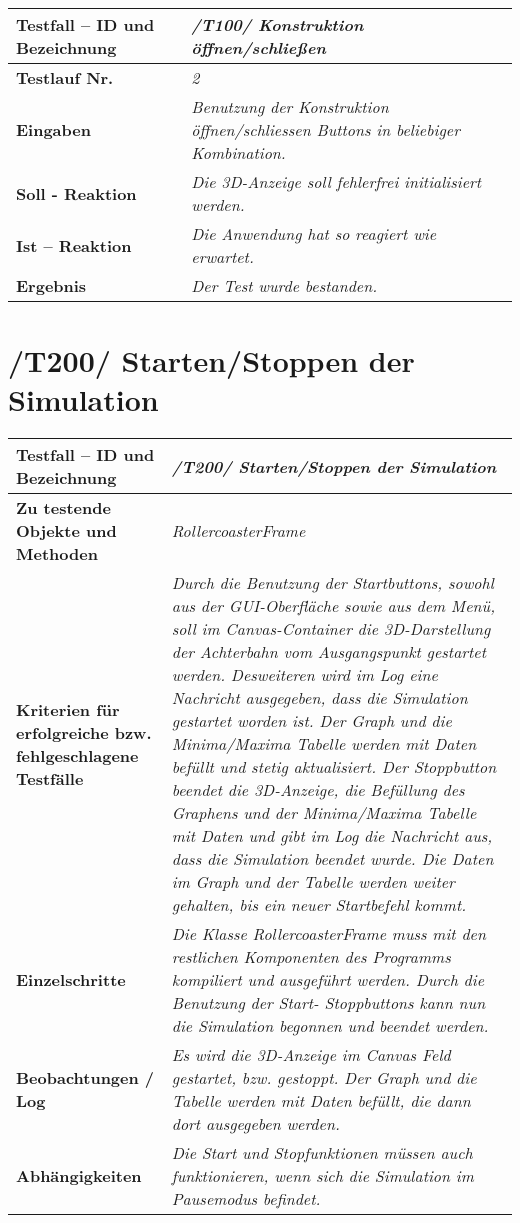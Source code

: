 \begin{longtable}{|p{7cm}|p{10cm}|}
\hline
\textbf{Testfall -- ID und Bezeichnung} & \textit{/T100/ Konstruktion öffnen/schließen} \\
\hline
\textbf{Testlauf Nr.} & \textit{2} \\
\hline
\textbf{Eingaben} & \textit{Benutzung der Konstruktion öffnen/schliessen Buttons in beliebiger Kombination.} \\
\hline
\textbf{Soll - Reaktion} & \textit{ Die 3D-Anzeige soll fehlerfrei initialisiert werden.} \\
\hline
\textbf{Ist -- Reaktion} & \textit{ Die Anwendung hat so reagiert wie erwartet.} \\
\hline
\textbf{Ergebnis} & \textit{Der Test wurde bestanden.} \\
\hline
\end{longtable}

\section{/T200/ Starten/Stoppen der Simulation}

\begin{longtable}{|p{7cm}|p{10cm}|}
\hline
\textbf{Testfall -- ID und Bezeichnung} &  \textit{/T200/ Starten/Stoppen der Simulation} \\
\hline
\textbf{Zu testende Objekte und Methoden} &  \textit{RollercoasterFrame}
\\
\hline
\textbf{Kriterien für erfolgreiche bzw. fehlgeschlagene Testfälle} &
\textit{Durch die Benutzung der Startbuttons, sowohl aus der GUI-Oberfläche sowie aus dem Menü, soll im Canvas-Container die 3D-Darstellung der Achterbahn vom Ausgangspunkt gestartet werden.
Desweiteren wird im Log eine Nachricht ausgegeben, dass die Simulation gestartet worden ist. Der Graph und die Minima/Maxima Tabelle werden mit Daten befüllt und stetig aktualisiert.
Der Stoppbutton beendet die 3D-Anzeige, die Befüllung des Graphens und der Minima/Maxima Tabelle mit Daten und gibt im Log die Nachricht aus, dass die Simulation beendet wurde. Die Daten im Graph
und der Tabelle werden weiter gehalten, bis ein neuer Startbefehl kommt.} \\
\hline
\textbf{Einzelschritte} &  \textit{Die Klasse RollercoasterFrame muss mit den restlichen Komponenten des Programms kompiliert und ausgeführt werden. Durch die Benutzung der Start- Stoppbuttons
kann nun die Simulation begonnen und beendet werden.} \\
\hline
\textbf{Beobachtungen / Log} &  \textit{Es wird die 3D-Anzeige im Canvas Feld gestartet, bzw. gestoppt. Der Graph und die Tabelle werden mit Daten befüllt, die dann dort ausgegeben werden.} \\
\hline
\textbf{Abhängigkeiten} &  \textit{Die Start und Stopfunktionen müssen auch funktionieren, wenn sich die Simulation im Pausemodus befindet.} \\
\hline
 \end{longtable}


